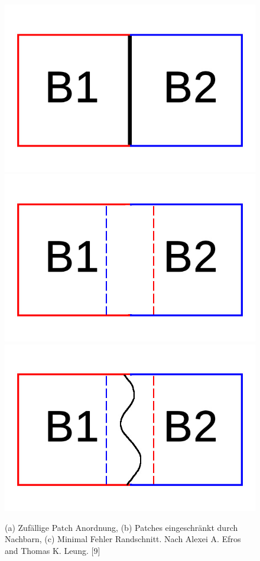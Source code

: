 \documentclass[12pt, a4paper,twoside,openright]{report}
\begin{document}
\begin{figure}[H]
    \centering
    \includegraphics[width=0.25\linewidth]{images/Random-blocks.jpg}%
    \qquad
    \includegraphics[width=0.25\linewidth]{images/overlap-blocks.jpg}%
    \qquad
    \includegraphics[width=0.25\linewidth]{images/minimum-boundary-blocks.jpg}%
    \qquad
    \qquad
    \qquad
    \qquad
    \caption{(a) Zufällige Patch Anordnung, (b) Patches eingeschränkt durch Nachbarn, (c) Minimal Fehler Randschnitt. Nach Alexei A. Efros and Thomas K. Leung. [9]}%
\end{figure}
\end{document}
